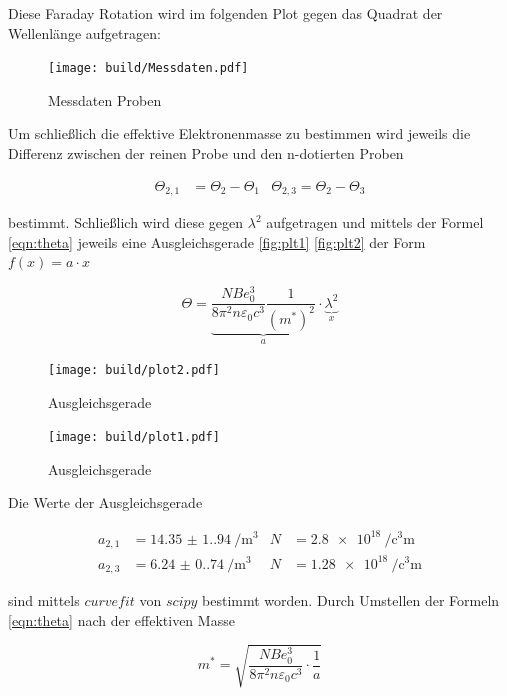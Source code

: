 Diese Faraday Rotation wird im folgenden Plot gegen das Quadrat der Wellenlänge aufgetragen: 

\begin{figure}[H]
	\centering
	\texttt{[image: build/Messdaten.pdf]}
	\caption{Messdaten Proben}\label{fig:Aufbau}
\end{figure}

Um schließlich die effektive Elektronenmasse zu bestimmen wird jeweils die Differenz zwischen der reinen Probe und den n-dotierten Proben

\begin{align*}
    \Theta_{2,1}&=\Theta_2-\Theta_1  & \Theta_{2,3}=\Theta_2-\Theta_3
\end{align*}

bestimmt.
Schließlich wird diese gegen $\lambda^2$ aufgetragen und mittels der Formel \eqref{eqn:theta} jeweils eine Ausgleichsgerade \eqref{fig:plt1} \eqref{fig:plt2} der Form $f(x)=a\cdot x$

\begin{equation}
    \Theta=\underbrace{\frac{NBe_0^3}{8 \pi^2 n \varepsilon_0 c^3} \frac{1}{(m^{\ast})^2}}_{a} \cdot \underbrace{\lambda^2}_{x}
    \label{eqn:theta}
\end{equation}

\begin{figure}[H]
	\centering
	\texttt{[image: build/plot2.pdf]}
	\caption{Ausgleichsgerade}\label{fig:plt1}
\end{figure}

\begin{figure}[H]
	\centering
	\texttt{[image: build/plot1.pdf]}
	\caption{Ausgleichsgerade}\label{fig:plt2}
\end{figure}

Die Werte der Ausgleichsgerade 

\begin{align}
    a_{2,1}&=\qty{14.35(1.94)}{\per\cubic\meter} & N&=\qty{2.8e18}{\per\cubic\centi\meter}\\
    a_{2,3}&=\qty{6.24(0.74)}{\per\cubic\meter}  & N&=\qty{1.28e18}{\per\cubic\centi\meter}
\end{align}

sind mittels $curvefit$ von $scipy$ \cite{scipy} bestimmt worden.
Durch Umstellen der Formeln \eqref{eqn:theta} nach der effektiven Masse

\begin{equation}
    m^{\ast}=\sqrt{\frac{NBe_0^3}{8 \pi^2 n \varepsilon_0 c^3} \cdot \frac{1}{a}}
\end{equation}

